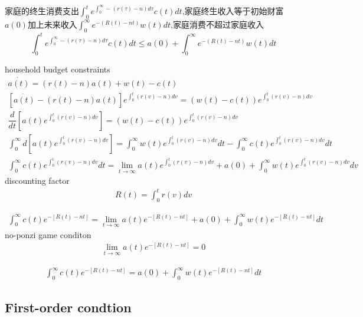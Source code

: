 家庭的终生消费支出$ \int_{0}^{t}e^{\int_{0}^{\infty}-(r(\tau)-n)d \tau } c(t)dt$,家庭终生收入等于初始财富$ a(0) $加上未来收入$ \int_{0}^{\infty}e^{-(R(t)-nt)} w(t) dt$,家庭消费不超过家庭收入
\begin{equation}
	\int_{0}^{t}e^{\int_{0}^{\infty}-(r(\tau)-n)d \tau } c(t)dt\le
	a(0)+\int_{0}^{\infty}e^{-(R(t)-nt)} w(t) dt
\end{equation}
\begin{framed}
	\begin{remark}
		household budget constraints
		\begin{equation}
		\begin{split}
		\dot{a(t)}=(r(t)-n)a(t)+w(t)-c(t)
		\\
		[\dot{a(t)}-(r(t)-n)a(t)]e^{\int_{0}^{t}(r(v)-n)dv}
		=\left(w(t)-c(t)\right)e^{\int_{0}^{t}(r(v)-n)dv}
		\\\dfrac{d}{dt}\left[a(t)e^{\int_{0}^{t}(r(v)-n)dv}\right]=\left(w(t)-c(t)\right)e^{\int_{0}^{t}(r(v)-n)dv}
		\\
		\int_{0}^{\infty}d\left[a(t)e^{\int_{0}^{t}(r(v)-n)dv}\right]=
		\int_{0}^{\infty}w(t)e^{\int_{0}^{t}(r(v)-n)dv}dt-\int_{0}^{\infty}c(t)e^{\int_{0}^{t}(r(v)-n)dv}dt
		\\
		\int_{0}^{\infty}c(t)e^{\int_{0}^{t}(r(v)-n)dv}dt=\lim\limits_{t\to \infty}a(t)e^{\int_{0}^{t}(r(v)-n)dv}+a(0)+\int_{0}^{\infty}w(t)e^{\int_{0}^{t}(r(v)-n)dv}dv
		\end{split}
		\end{equation}
		discounting factor
		\begin{gather}
		R(t)=\int_{0}^{t}r(v)dv
		\end{gather}
		
		\begin{gather}
		\int_{0}^{\infty}c(t)e^{-[R(t)-nt]}=\lim\limits_{t\to \infty}a(t)e^{-[R(t)-nt]}+a(0)+\int_{0}^{\infty}w(t)e^{-[R(t)-nt]}dt	
		\end{gather}
		no-ponzi game conditon
		\begin{gather}
		\lim\limits_{t\to \infty}a(t)e^{-[R(t)-nt]}=0
		\end{gather}
		
		\begin{gather}
		\int_{0}^{\infty}c(t)e^{-[R(t)-nt]}=a(0)+\int_{0}^{\infty}w(t)e^{-[R(t)-nt]}dt	
		\end{gather}
	\end{remark}
\end{framed}


\subsection{First-order condtion}

